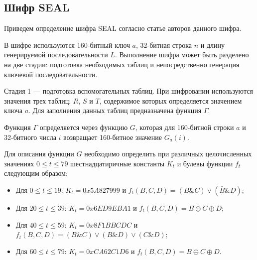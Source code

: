 \documentclass{./civarticle}
\begin{document}
\begin{figure}[h]
\end{figure}

\subsection{Шифр SEAL}
Приведем определение шифра SEAL согласно статье \cite{seal} авторов данного шифра.

В шифре используются 160-битный ключ $a$, 32-битная строка $n$ и длину генерируемой последовательности $L$. Выполнение шифра может быть разделено на две стадии: подготовка необходимых таблиц и непосредственно генерация ключевой последовательности.

Стадия 1 --- подготовка вспомогательных таблиц.
При шифровании используются значения трех таблиц: $R$, $S$ и $T$, содержимое которых определяется значением ключа $a$. Для заполнения данных таблиц предназначена функция $\Gamma$.

Функция $\Gamma$ определяется через функцию $G$, которая для 160-битной строки $a$ и 32-битного числа $i$ возвращает 160-битное значение $G_a(i)$.

Для описания функции $G$ необходимо определить при различных целочисленных значениях $0 \leq t \leq 79$ шестнадцатиричные константы $K_t$ и булевы функции $f_t$ следующим образом:
\begin{itemize}
    \item Для $0 \leq t \leq 19$: $K_t = 0x5A827999$ и $f_t(B, C, D) = (B \& C) \vee (\bar B \& D)$;
    \item Для $20 \leq t \leq 39$: $K_t = 0x6ED9EBA1$ и $f_t(B, C, D) = B \oplus C \oplus D$;
    \item Для $40 \leq t \leq 59$: $K_t = 0x8F1BBCDC$ и $f_t(B, C, D) = (B \& C) \vee (B \& D) \vee (C \& D)$;
    \item Для $60 \leq t \leq 79$: $K_t = 0xCA62C1D6$ и $f_t(B, C, D) = B \oplus C \oplus D$.
\end{itemize}
\end{document}
